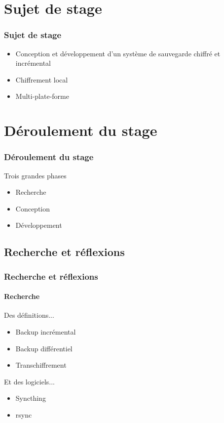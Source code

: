 \documentclass{beamer}
\begin{document}
\section{Sujet de stage}
\begin{frame}
 \frametitle{Sujet de stage}
 \begin{itemize}
  \item Conception et d\'eveloppement d'un syst\`eme de sauvegarde
  chiffr\'e et incr\'emental
  \item Chiffrement local
  \item Multi-plate-forme
 \end{itemize}
\end{frame}

\section{D\'eroulement du stage}
\begin{frame}
 \frametitle{D\'eroulement du stage}
 Trois grandes phases
 \begin{itemize}
  \item Recherche
  \item Conception
  \item D\'eveloppement
 \end{itemize}
\end{frame}

\subsection{Recherche et r\'eflexions}
\begin{frame}
 \frametitle{Recherche et r\'eflexions}
 \framesubtitle{Recherche}
 Des d\'efinitions...
 \begin{itemize}
  \item Backup incr\'emental
  \item Backup diff\'erentiel
  \item Transchiffrement\\[0.51cm]
 \end{itemize}
 
 Et des logiciels...
 \begin{itemize}
  \item Syncthing
  \item rsync
 \end{itemize}
\end{frame}
\end{document}
